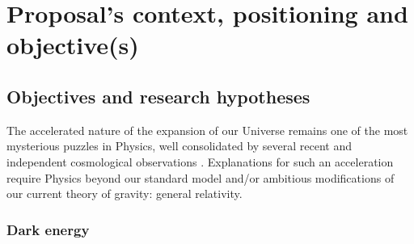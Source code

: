 \section{Proposal's context, positioning and objective(s)}






\subsection{Objectives and research hypotheses}
 
The accelerated nature of the expansion of our Universe remains one of the most 
mysterious puzzles in Physics, %
well consolidated by several recent and 
independent cosmological observations 
\cite{planckcollaborationPlanck2018Results2020,
broutPantheonAnalysisCosmological2022,
rubinUnionUNITYCosmology2025,
descollaborationDarkEnergySurvey2024,
desicollaborationDESIDR2Results2025}.
Explanations for such an acceleration require Physics beyond our standard model 
and/or ambitious modifications of our current theory of gravity: 
general relativity.

\subsubsection*{Dark energy} 

